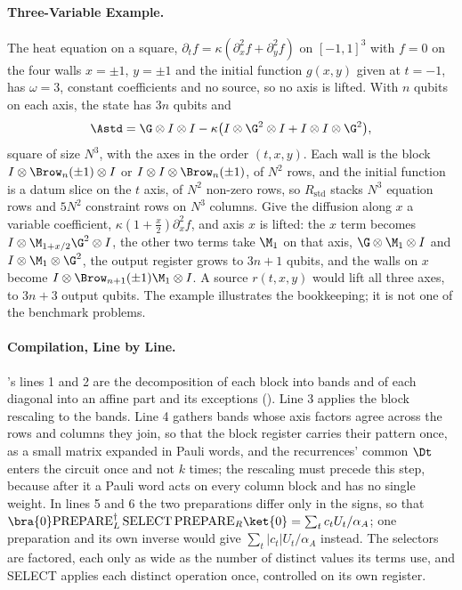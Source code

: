 \paragraph{Three-Variable Example.} The heat equation on a square, $\partial_tf=\kappa(\partial_x^2f+\partial_y^2f)$ on $[-1,1]^3$ with $f=0$ on the four walls $x=\pm1$, $y=\pm1$ and the initial function $g(x,y)$ given at $t=-1$, has $\omega=3$, constant coefficients and no source, so no axis is lifted. With $n$ qubits on each axis, the state has $3n$ qubits and
\begin{equation*}
    \Astd=\G\otimes I\otimes I-\kappa\bigl(I\otimes\G^2\otimes I+I\otimes I\otimes\G^2\bigr),
\end{equation*}
square of size $N^3$, with the axes in the order $(t,x,y)$. Each wall is the block $I\otimes\Brow_n(\pm1)\otimes I$ or $I\otimes I\otimes\Brow_n(\pm1)$, of $N^2$ rows, and the initial function is a datum slice on the $t$ axis, of $N^2$ non-zero rows, so $R_{\mathrm{std}}$ stacks $N^3$ equation rows and $5N^2$ constraint rows on $N^3$ columns. Give the diffusion along $x$ a variable coefficient, $\kappa(1+\tfrac x2)\partial_x^2f$, and axis $x$ is lifted: the $x$ term becomes $I\otimes\M_{1+x/2}\G^2\otimes I$, the other two terms take $\M_1$ on that axis, $\G\otimes\M_1\otimes I$ and $I\otimes\M_1\otimes\G^2$, the output register grows to $3n+1$ qubits, and the walls on $x$ become $I\otimes\Brow_{n+1}(\pm1)\M_1\otimes I$. A source $r(t,x,y)$ would lift all three axes, to $3n+3$ output qubits. The example illustrates the bookkeeping; it is not one of the benchmark problems.

\paragraph{Compilation, Line by Line.} 's lines 1 and 2 are the decomposition of each block into bands and of each diagonal into an affine part and its exceptions (). Line 3 applies the block rescaling to the bands. Line 4 gathers bands whose axis factors agree across the rows and columns they join, so that the block register carries their pattern once, as a small matrix expanded in Pauli words, and the recurrences' common $\Dt$ enters the circuit once and not $k$ times; the rescaling must precede this step, because after it a Pauli word acts on every column block and has no single weight. In lines 5 and 6 the two preparations differ only in the signs, so that $\bra{0}\mathrm{PREPARE}_L^\dagger\,\mathrm{SELECT}\,\mathrm{PREPARE}_R\ket{0}=\sum_tc_tU_t/\alpha_A$; one preparation and its own inverse would give $\sum_t|c_t|U_t/\alpha_A$ instead. The selectors are factored, each only as wide as the number of distinct values its terms use, and SELECT applies each distinct operation once, controlled on its own register.

